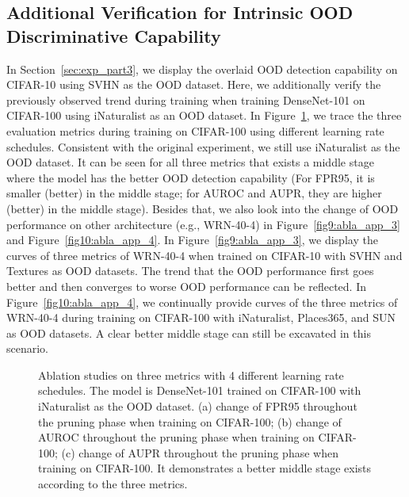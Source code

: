 \documentclass{article}
\theoremstyle{plain}
\theoremstyle{definition}
\theoremstyle{remark}
\begin{document}
\subsection{Additional Verification for Intrinsic OOD Discriminative Capability}
\label{app:verf_intrinsic_power}

In Section~\ref{sec:exp_part3}, we display the overlaid OOD detection capability on CIFAR-10 using SVHN as the OOD dataset. Here, we additionally verify the previously observed trend during training when training DenseNet-101 on CIFAR-100 using iNaturalist as an OOD dataset. In Figure~\ref{fig8:abla_app_2}, we trace the three evaluation metrics during training on CIFAR-100 using  different learning rate schedules. Consistent with the original experiment, we still use iNaturalist as the OOD dataset. It can be seen for all three metrics that exists a middle stage where the model has the better OOD detection capability (For FPR95, it is smaller (better) in the middle stage; for AUROC and AUPR, they are higher (better) in the middle stage). Besides that, we also look into the change of OOD performance on other architecture (e.g., WRN-40-4) in Figure~\ref{fig9:abla_app_3} and Figure~\ref{fig10:abla_app_4}. In Figure~\ref{fig9:abla_app_3}, we display the curves of three metrics of WRN-40-4 when trained on CIFAR-10 with SVHN and Textures as OOD datasets.  The trend that the OOD performance first goes better and then converges to worse OOD performance can be reflected. In Figure~\ref{fig10:abla_app_4}, we continually provide curves of the three metrics of WRN-40-4 during training on CIFAR-100 with iNaturalist, Places365, and SUN as OOD datasets. A clear better middle stage can still be 
excavated in this scenario.

\begin{figure}[t!]
    \begin{center}

    \end{center}
    \caption{Ablation studies on three metrics with 4 different learning rate schedules. The model is DenseNet-101 trained on CIFAR-100 with iNaturalist as the OOD dataset. (a) change of FPR95 throughout the pruning phase when training on CIFAR-100; (b) change of AUROC throughout the pruning phase when training on CIFAR-100; (c) change of AUPR throughout the pruning phase when training on CIFAR-100. It demonstrates a better middle stage exists according to the three metrics.}
    \label{fig8:abla_app_2}
\end{figure}
\end{document}
